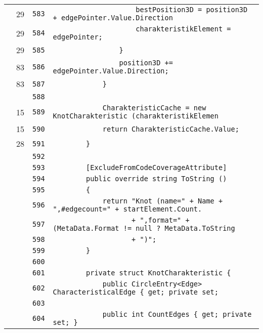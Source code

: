 \documentclass[a4paper,10pt]{article}
\begin{document}
\begin{longtable}[l]{lrrl}
\cellcolor{green} & 29 & \verb~583~ & \verb~                    bestPosition3D = position3D + edgePointer.Value.Direction ~\\
\cellcolor{green} & 29 & \verb~584~ & \verb~                    charakteristikElement = edgePointer;~\\
\cellcolor{green} & 29 & \verb~585~ & \verb~                }~\\
\cellcolor{green} & 83 & \verb~586~ & \verb~                position3D += edgePointer.Value.Direction;~\\
\cellcolor{green} & 83 & \verb~587~ & \verb~            }~\\
\cellcolor{gray} &  & \verb~588~ & \verb~~\\
\cellcolor{green} & 15 & \verb~589~ & \verb~            CharakteristicCache = new KnotCharakteristic (charakteristikElemen~\\
\cellcolor{green} & 15 & \verb~590~ & \verb~            return CharakteristicCache.Value;~\\
\cellcolor{green} & 28 & \verb~591~ & \verb~        }~\\
\cellcolor{gray} &  & \verb~592~ & \verb~~\\
\cellcolor{gray} &  & \verb~593~ & \verb~        [ExcludeFromCodeCoverageAttribute]~\\
\cellcolor{gray} &  & \verb~594~ & \verb~        public override string ToString ()~\\
\cellcolor{gray} &  & \verb~595~ & \verb~        {~\\
\cellcolor{gray} &  & \verb~596~ & \verb~            return "Knot (name=" + Name + ",#edgecount=" + startElement.Count.~\\
\cellcolor{gray} &  & \verb~597~ & \verb~                   + ",format=" + (MetaData.Format != null ? MetaData.ToString~\\
\cellcolor{gray} &  & \verb~598~ & \verb~                   + ")";~\\
\cellcolor{gray} &  & \verb~599~ & \verb~        }~\\
\cellcolor{gray} &  & \verb~600~ & \verb~~\\
\cellcolor{gray} &  & \verb~601~ & \verb~        private struct KnotCharakteristic {~\\
\cellcolor{gray} &  & \verb~602~ & \verb~            public CircleEntry<Edge> CharacteristicalEdge { get; private set; ~\\
\cellcolor{gray} &  & \verb~603~ & \verb~~\\
\cellcolor{gray} &  & \verb~604~ & \verb~            public int CountEdges { get; private set; }~\\

\end{longtable}
\end{document}
